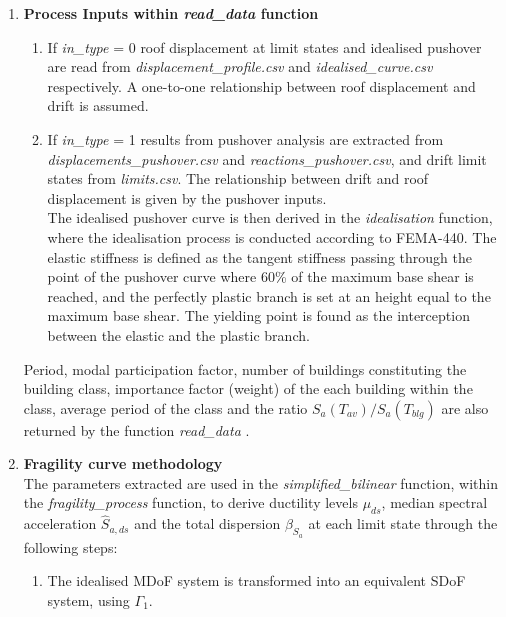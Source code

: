 \begin{enumerate}
\item \textbf{Process Inputs within \textit{read\_data}  function}\\
\begin{enumerate}
\item If \textit{in\_type} = 0 roof displacement at limit states and idealised pushover are read from \textit{displacement\_profile.csv} and \textit{idealised\_curve.csv} respectively. A one-to-one relationship between roof displacement and drift is assumed.
\item If \textit{in\_type} = 1 results from pushover analysis are extracted from \textit{displacements\_pushover.csv} and \textit{reactions\_pushover.csv}, and drift limit states from \textit{limits.csv}. The relationship between drift and roof displacement is given by the pushover inputs.\\
The idealised 	pushover curve is then derived in the \textit{idealisation} function, where the idealisation process is conducted according to FEMA-440. The elastic stiffness is defined as the 	tangent stiffness passing through the point of the pushover curve where 60\% of the maximum base shear is reached, and the perfectly plastic branch is set at an height equal to 	the maximum base shear. The yielding point is found as the interception between the elastic and the plastic branch.\\
\end{enumerate}

Period, modal participation factor, number of buildings constituting the building class, importance factor (weight) of the each building within the class, average period of the class and the ratio $S_a(T_{av})/S_a(T_{blg})$ are also returned by the function \textit{read\_data} .\\

\item \textbf{Fragility curve methodology}\\
The parameters extracted are used in the \textit{simplified\_bilinear} function, within the \textit{fragility\_process} function, to derive ductility levels $\mu_{ds}$, median spectral acceleration $\hat{S}_{a,ds}$ and the total dispersion $\beta_{S_a}$ at each limit state through the following steps:

\begin{enumerate}

\item The idealised MDoF system is transformed into an equivalent SDoF system, using $\Gamma_1$.


\end{enumerate}
\end{enumerate}
